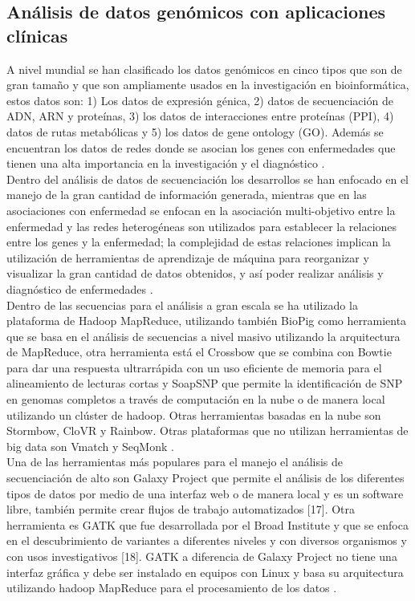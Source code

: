 \subsection{Análisis de datos genómicos con aplicaciones clínicas}

A nivel mundial se han clasificado los datos genómicos en cinco tipos que son de gran tamaño y que son ampliamente usados en la investigación en bioinformática, estos datos son: 1) Los datos de expresión génica, 2) datos de secuenciación de ADN, ARN y proteínas, 3) los datos de interacciones entre proteínas (PPI), 4) datos de rutas metabólicas y 5) los datos de gene ontology (GO). Además se encuentran los datos de redes donde se asocian los genes con enfermedades que tienen una alta importancia en la investigación y el diagnóstico \cite{Kashyap2015}.\\

Dentro del análisis de datos de secuenciación los desarrollos se han enfocado en el manejo de la gran cantidad de información generada, mientras que en las asociaciones con enfermedad se enfocan en la asociación multi-objetivo entre la enfermedad  y las redes heterogéneas son utilizados para establecer la relaciones entre los genes y la enfermedad; la complejidad de estas relaciones implican la utilización de herramientas de aprendizaje de máquina para reorganizar y visualizar la gran cantidad de datos obtenidos, y así poder realizar análisis y diagnóstico de enfermedades \cite{Kashyap2015}. \\

Dentro de las secuencias para el análisis a gran escala se ha utilizado la plataforma de Hadoop MapReduce, utilizando también BioPig  como herramienta que se basa en el análisis de secuencias a nivel masivo utilizando la arquitectura de MapReduce, otra herramienta está el Crossbow que se combina con Bowtie para dar una respuesta ultrarrápida con un uso eficiente de memoria para el alineamiento de lecturas cortas y SoapSNP que permite la identificación de SNP en genomas completos a través de computación en la nube o de manera local utilizando un clúster de hadoop. Otras herramientas basadas en la nube son Stormbow, CloVR y Rainbow. Otras plataformas que no utilizan herramientas de big data son Vmatch y SeqMonk \cite{Kashyap2015}.\\

Una de las herramientas más populares para el manejo el análisis de secuenciación de alto son Galaxy Project que permite el análisis de los diferentes tipos de datos por medio de una interfaz web o de manera local y es un software libre, también permite crear flujos de trabajo automatizados [17]. Otra herramienta es GATK que fue desarrollada por el Broad Institute y que se enfoca en el descubrimiento de variantes  a diferentes niveles y con diversos organismos y con usos investigativos [18]. GATK a diferencia de Galaxy Project no tiene una interfaz gráfica y debe ser instalado en equipos con Linux y basa su arquitectura utilizando hadoop MapReduce para el procesamiento de los datos \cite{Maharjan2011} .\\

